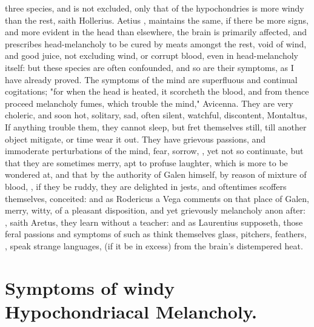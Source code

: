 {three species, and is not excluded, only that of the hypochondries is
more windy than the rest, saith Hollerius. Aetius
, maintains the same,
if there be more signs, and more evident in the head than
elsewhere, the brain is primarily affected, and prescribes head-melancholy to
be cured by meats amongst the rest, void of wind, and good juice, not excluding
wind, or corrupt blood, even in head-melancholy itself: but these species are
often confounded, and so are their symptoms, as I have already proved. The
symptoms of the mind are superfluous and continual cogitations;
"for when the head is heated, it scorcheth the blood, and
from thence proceed melancholy fumes, which trouble the mind," Avicenna. They
are very choleric, and soon hot, solitary, sad, often silent, watchful,
discontent, Montaltus,  If anything trouble
them, they cannot sleep, but fret themselves still, till another object
mitigate, or time wear it out. They have grievous passions, and immoderate
perturbations of the mind, fear, sorrow, \etc{}, yet not so continuate, but
that they are sometimes merry, apt to profuse laughter, which is more to be
wondered at, and that by the authority of Galen himself,
by reason of mixture of blood, , if they be ruddy, they are delighted in jests, and oftentimes
scoffers themselves, conceited: and as Rodericus a Vega comments on that place
of Galen, merry, witty, of a pleasant disposition, and yet grievously
melancholy anon after: , saith Aretus, they
learn without a teacher: and as Laurentius supposeth,
those feral passions and symptoms of such as think themselves glass, pitchers,
feathers, \etc{}, speak strange languages,  (if it be in
excess) from the brain's distempered heat.

\section{Symptoms of windy Hypochondriacal Melancholy.}

}
